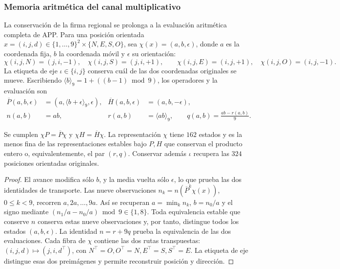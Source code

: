 \subsubsection{Memoria aritmética del canal multiplicativo}
\label{prd-arit:seccion}

La conservación de la firma regional se prolonga a la evaluación
aritmética completa de APP. Para una posición orientada
\(x=(i,j,d)\in\{1,\ldots,9\}^2\times\{N,E,S,O\}\), sea
\(\chi(x)=(a,b,\epsilon)\), donde \(a\) es la coordenada fija,
\(b\) la coordenada móvil y \(\epsilon\) su orientación:
\[
 \chi(i,j,N)=(j,i,-1),\quad \chi(i,j,S)=(j,i,+1),\qquad
 \chi(i,j,E)=(i,j,+1),\quad \chi(i,j,O)=(i,j,-1).
\]
La etiqueta de eje \(\iota\in\{i,j\}\) conserva cuál de las
dos coordenadas originales se mueve. Escribiendo
\(\langle b\rangle_9=1+((b-1)\bmod9)\), los operadores y la
evaluación son
\begin{align}
 \overline P(a,b,\epsilon)&=(a,\langle b+\epsilon\rangle_9,\epsilon),
 &\overline H(a,b,\epsilon)&=(a,b,-\epsilon),\label{prd-arit:PH}\\
 n(a,b)&=ab,&r(a,b)&=\langle ab\rangle_9,\qquad
 q(a,b)=\frac{ab-r(a,b)}9.\label{prd-arit:rq}
\end{align}

\begin{proposition}
\label{prd-arit:minimal}
Se cumplen \(\chi P=\overline P\chi\) y
\(\chi H=\overline H\chi\). La representación \(\chi\)
tiene \(162\) estados y es la menos fina de las representaciones
estables bajo \(P,H\) que conservan el producto entero o,
equivalentemente, el par \((r,q)\). Conservar además \(\iota\)
recupera las \(324\) posiciones orientadas originales.
\end{proposition}
\begin{proof}
El avance modifica sólo \(b\), y la media vuelta sólo
\(\epsilon\), lo que prueba las dos identidades de transporte.
Las nueve observaciones \(n_k=n(\overline P^k\chi(x))\),
\(0\leq k<9\), recorren \(a,2a,\ldots,9a\). Así se recuperan
\(a=\min_k n_k\), \(b=n_0/a\) y el signo mediante
\((n_1/a-n_0/a)\bmod9\in\{1,8\}\). Toda equivalencia estable
que conserve \(n\) conserva estas nueve observaciones y, por
tanto, distingue todos los estados \((a,b,\epsilon)\).
La identidad \(n=r+9q\) prueba la equivalencia de las dos
evaluaciones. Cada fibra de \(\chi\) contiene las dos rutas
transpuestas: \((i,j,d)\mapsto(j,i,d^\top)\), con
\(N^\top=O,O^\top=N,E^\top=S,S^\top=E\). La etiqueta de eje distingue
esas dos preimágenes y permite reconstruir posición y dirección.
\end{proof}

